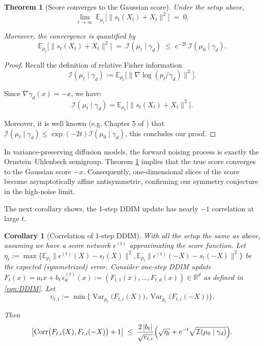 \documentclass[12pt]{article}
\newcommand{\0}{\mathbf{0}}
\DeclareMathOperator{\Corr}{Corr}
\DeclareMathOperator{\Var}{Var}
\newcommand{\E}{\mathbb{E}}
\newcommand{\FI}{\mathcal{I}}  %
\newtheorem{theorem}{Theorem}
\newtheorem{corollary}{Corollary}
\begin{document}
\begin{theorem}[Score converges to the Gaussian score]
\label{thm:score-to-minus-x}
Under the setup above,
\[
\lim_{t\to\infty}\ \E_{\mu_t}\!\bigl[\|s_t(X_t)+X_t\|^2\bigr]\;=\;0.
\]

Moreover, the convergence is quantified by
\[
\E_{\mu_t}\!\bigl[\|s_t(X_t)+X_t\|^2\bigr]\;=\;\FI(\mu_t\mid\gamma_d)\;\le\;e^{-2t}\,\FI(\mu_0\mid\gamma_d).
\]
\end{theorem}

\begin{proof}
Recall the definition of relative Fisher information
\[
\FI(\mu_t\mid\gamma_d)
:=\E_{\mu_t}\!\bigl[\|\nabla\log(p_t/\gamma_d)\|^2\bigr].
\]

Since $\nabla \gamma_d(x) = -x$, we have:
\[
\FI(\mu_t\mid\gamma_d) =\E_{\mu_t}\!\bigl[\|s_t(X_t) + X_t\|^2\bigr].
\]

Moreover, it is well known (e.g. Chapter 5 of \cite{bakry2013analysis}) that $\FI(\mu_t\mid\gamma_d)\leq \exp(-2t)\FI(\mu_0\mid\gamma_d)$, this concludes our proof.
\end{proof}



In variance-preserving diffusion models, the forward noising process is exactly the Ornstein–Uhlenbeck semigroup. Theorem \ref{thm:score-to-minus-x} implies that the true score converges 
 to the Gaussian score  $-x$. Consequently, one-dimensional slices of the score become asymptotically affine antisymmetric, confirming our symmetry conjecture in the high-noise limit.

The next corollary shows, the 1-step DDIM update has nearly $-1$ correlation at large $t$.


\begin{corollary}[Correlation of 1-step DDIM]
With all the setup the same as above, assuming we have a score network $\epsilon^{(t)}$ approximating the score function.  Let 
$\eta_t:=\max\{\mathbb{E}_{p_t}\|\epsilon^{(t)}(X)-s_t(X)\|^2, \mathbb{E}_{p_t}\|\epsilon^{(t)}(-X)-s_t(-X)\|^2\}$ be the expected (symmetrized) error. Consider one-step DDIM update $F_t(x)=a_t x+b_t\,\epsilon^{(t)}_\theta(x) := (F_{t,1}(x), \ldots, F_{t,d}(x))\in \mathbb R^d$ as defined in \eqref{eqn:DDIM}. Let
\[
v_{t,i} := \min\{\Var_{p_t}\!\big(F_{t,i}(X)\big),\Var_{p_t}\!\big(F_{t,i}(-X)\big) \}.
\]

 Then
\[
\bigl|\Corr\bigl(F_{t,i}(X),F_{t,i}(-X)\bigr)+1\bigr|
\;\le\; \frac{2\,|b_t|}{\sqrt{v_{t,i}}}\Bigl(\sqrt{\eta_t}+e^{-t}\sqrt{\FI(\mu_0\mid\gamma_d)}\Bigr).
\]
\end{corollary}
\end{document}
